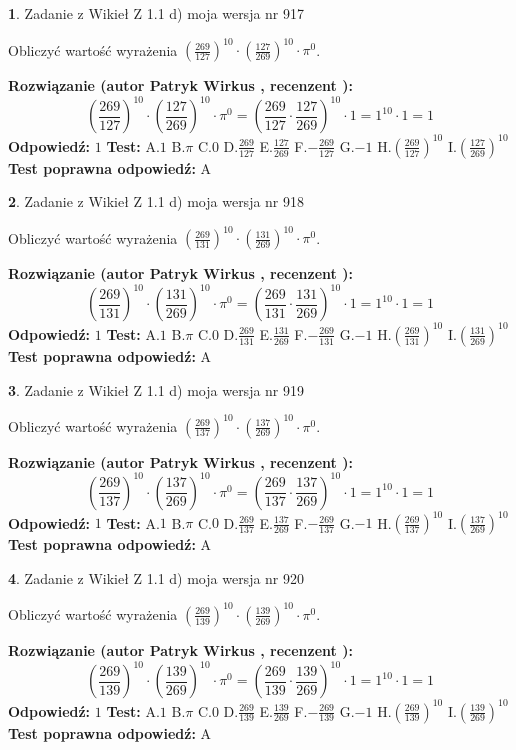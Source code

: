 \documentclass[12pt, a4paper]{article}
\theoremstyle{definition} %
\newtheorem{zad}{}
\newcommand{\zadStart}[1]{\begin{zad}#1\newline}
\newcommand{\zadStop}{\end{zad}}
\newcommand{\rozwStart}[2]{\noindent \textbf{Rozwiązanie (autor #1 , recenzent #2): }\newline}
\newcommand{\rozwStop}{\newline}
\newcommand{\odpStart}{\noindent \textbf{Odpowiedź:}\newline}
\newcommand{\odpStop}{\newline}
\newcommand{\testStart}{\noindent \textbf{Test:}\newline}
\newcommand{\testStop}{\newline}
\newcommand{\kluczStart}{\noindent \textbf{Test poprawna odpowiedź:}\newline}
\newcommand{\kluczStop}{\newline}
\begin{document}
\zadStart{Zadanie z Wikieł Z 1.1 d) moja wersja nr 917}

Obliczyć wartość wyrażenia $(\frac{269}{127})^{10} \cdot (\frac{127}{269})^{10} \cdot \pi^{0}$.
\zadStop
\rozwStart{Patryk Wirkus}{}
$$(\frac{269}{127})^{10} \cdot (\frac{127}{269})^{10} \cdot \pi^{0} = (\frac{269}{127} \cdot \frac{127}{269})^{10} \cdot 1 = 1^{10} \cdot 1 = 1$$
\rozwStop
\odpStart
$1$
\odpStop
\testStart
A.$1$ B.$\pi$ C.$0$ D.$\frac{269}{127}$ E.$\frac{127}{269}$
F.$-\frac{269}{127}$ G.$-1$
H.$(\frac{269}{127})^{10}$
I.$(\frac{127}{269})^{10}$
\testStop
\kluczStart
A
\kluczStop



\zadStart{Zadanie z Wikieł Z 1.1 d) moja wersja nr 918}

Obliczyć wartość wyrażenia $(\frac{269}{131})^{10} \cdot (\frac{131}{269})^{10} \cdot \pi^{0}$.
\zadStop
\rozwStart{Patryk Wirkus}{}
$$(\frac{269}{131})^{10} \cdot (\frac{131}{269})^{10} \cdot \pi^{0} = (\frac{269}{131} \cdot \frac{131}{269})^{10} \cdot 1 = 1^{10} \cdot 1 = 1$$
\rozwStop
\odpStart
$1$
\odpStop
\testStart
A.$1$ B.$\pi$ C.$0$ D.$\frac{269}{131}$ E.$\frac{131}{269}$
F.$-\frac{269}{131}$ G.$-1$
H.$(\frac{269}{131})^{10}$
I.$(\frac{131}{269})^{10}$
\testStop
\kluczStart
A
\kluczStop



\zadStart{Zadanie z Wikieł Z 1.1 d) moja wersja nr 919}

Obliczyć wartość wyrażenia $(\frac{269}{137})^{10} \cdot (\frac{137}{269})^{10} \cdot \pi^{0}$.
\zadStop
\rozwStart{Patryk Wirkus}{}
$$(\frac{269}{137})^{10} \cdot (\frac{137}{269})^{10} \cdot \pi^{0} = (\frac{269}{137} \cdot \frac{137}{269})^{10} \cdot 1 = 1^{10} \cdot 1 = 1$$
\rozwStop
\odpStart
$1$
\odpStop
\testStart
A.$1$ B.$\pi$ C.$0$ D.$\frac{269}{137}$ E.$\frac{137}{269}$
F.$-\frac{269}{137}$ G.$-1$
H.$(\frac{269}{137})^{10}$
I.$(\frac{137}{269})^{10}$
\testStop
\kluczStart
A
\kluczStop



\zadStart{Zadanie z Wikieł Z 1.1 d) moja wersja nr 920}

Obliczyć wartość wyrażenia $(\frac{269}{139})^{10} \cdot (\frac{139}{269})^{10} \cdot \pi^{0}$.
\zadStop
\rozwStart{Patryk Wirkus}{}
$$(\frac{269}{139})^{10} \cdot (\frac{139}{269})^{10} \cdot \pi^{0} = (\frac{269}{139} \cdot \frac{139}{269})^{10} \cdot 1 = 1^{10} \cdot 1 = 1$$
\rozwStop
\odpStart
$1$
\odpStop
\testStart
A.$1$ B.$\pi$ C.$0$ D.$\frac{269}{139}$ E.$\frac{139}{269}$
F.$-\frac{269}{139}$ G.$-1$
H.$(\frac{269}{139})^{10}$
I.$(\frac{139}{269})^{10}$
\testStop
\kluczStart
A
\kluczStop
\end{document}
